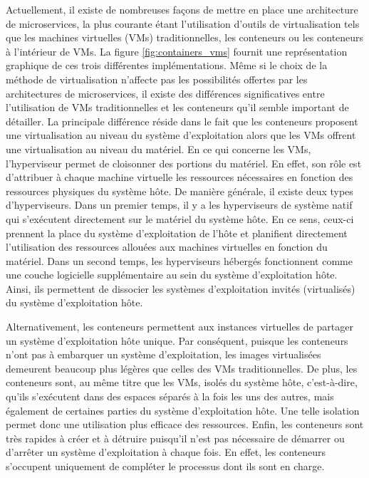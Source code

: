 Actuellement, il existe de nombreuses façons de mettre en place une architecture de microservices, la plus courante étant l'utilisation d'outils de virtualisation tels que les machines virtuelles (\acsp{VM}) traditionnelles, les conteneurs ou les conteneurs à l'intérieur de \acsp{VM}. La figure \ref{fig:containers_vms} fournit une représentation graphique de ces trois différentes implémentations. Même si le choix de la méthode de virtualisation n'affecte pas les possibilités offertes par les architectures de microservices, il existe des différences significatives entre l'utilisation de \acsp{VM} traditionnelles et les conteneurs qu'il semble important de détailler. La principale différence réside dans le fait que les conteneurs proposent une virtualisation au niveau du système d'exploitation alors que les \acsp{VM} offrent une virtualisation au niveau du matériel. En ce qui concerne les \acsp{VM}, l'hyperviseur permet de cloisonner des portions du matériel. En effet, son rôle est d'attribuer à chaque machine virtuelle les ressources nécessaires en fonction des ressources physiques du système hôte. De manière générale, il existe deux types d'hyperviseurs. Dans un premier temps, il y a les hyperviseurs de système natif qui s'exécutent directement sur le matériel du système hôte. En ce sens, ceux-ci prennent la place du système d'exploitation de l'hôte et planifient directement l'utilisation des ressources allouées aux machines virtuelles en fonction du matériel. Dans un second temps, les hyperviseurs hébergés fonctionnent comme une couche logicielle supplémentaire au sein du système d'exploitation hôte. Ainsi, ils permettent de dissocier les systèmes d'exploitation invités (virtualisés) du système d'exploitation hôte.

Alternativement, les conteneurs permettent aux instances virtuelles de partager un système d'exploitation hôte unique. Par conséquent, puisque les conteneurs n'ont pas à embarquer un système d'exploitation, les images virtualisées demeurent beaucoup plus légères que celles des \acsp{VM} traditionnelles. De plus, les conteneurs sont, au même titre que les \acsp{VM}, isolés du système hôte, c'est-à-dire, qu'ils s'exécutent dans des espaces séparés à la fois les uns des autres, mais également de certaines parties du système d'exploitation hôte. Une telle isolation permet donc une utilisation plus efficace des ressources. Enfin, les conteneurs sont très rapides à créer et à détruire puisqu'il n'est pas nécessaire de démarrer ou d'arrêter un système d'exploitation à chaque fois. En effet, les conteneurs s'occupent uniquement de compléter le processus dont ils sont en charge.

